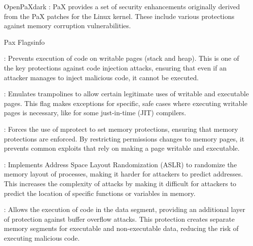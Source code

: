 \label{OpenPaX}
\begin{baseBoxThree}{OpenPaX}{dark}
    \bigskip
    : PaX provides a set of security enhancements originally derived from the PaX patches for the Linux kernel.
    These include various protections against memory corruption vulnerabilities.
    \bigskip
    \label{Open Flags}
    \begin{baseBoxThree}{Pax Flags}{info}
        \smallskip
        \begin{posnexItemize}
            \item[\sA] : Prevents execution of code on writable pages (stack and heap). 
            This is one of the key protections against code injection attacks, ensuring that even if an attacker manages to inject malicious code, it cannot be executed.
            \item[\sA] : Emulates trampolines to allow certain legitimate uses of writable and executable pages.
            This flag makes exceptions for specific, safe cases where executing writable pages is necessary, like for some just-in-time (JIT) compilers.
            \item[\sA] : Forces the use of mprotect to set memory protections, ensuring that memory protections are enforced.
            By restricting permissions changes to memory pages, it prevents common exploits that rely on making a page writable and executable.
            \item[\sA] : Implements Address Space Layout Randomization (ASLR) to randomize the memory layout of processes, making it harder for attackers to predict addresses.
            This increases the complexity of attacks by making it difficult for attackers to predict the location of specific functions or variables in memory.
            \item[\sA] : Allows the execution of code in the data segment, providing an additional layer of protection against buffer overflow attacks.
            This protection creates separate memory segments for executable and non-executable data, reducing the risk of executing malicious code.
        \end{posnexItemize}
        \smallskip
    \end{baseBoxThree}
    \smallskip
\end{baseBoxThree}

